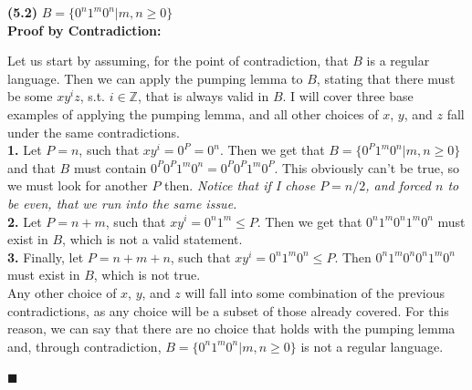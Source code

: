 \documentclass[11pt]{article}
\begin{document}
\textbf{(5.2)} $B=\{0^n 1^m 0^n | m,n \geq 0\}$\\

\textbf{Proof by Contradiction:}

Let us start by assuming, for the point of contradiction, that $B$ is a regular language. Then we can apply the pumping lemma to $B$, stating that there must be some $xy^i z$, s.t. $i\in \mathbb{Z}$, that is always valid in $B$. I will cover three base examples of applying the pumping lemma, and all other choices of $x$, $y$, and $z$ fall under the same contradictions. \\

\textbf{1.} Let $P=n$, such that $xy^i = 0^P = 0^n$. Then we get that $B=\{0^P 1^m 0^n | m,n \geq 0\}$ and that $B$ must contain $0^P 0^P 1^m 0^n = 0^P 0^P 1^m 0^P$. This obviously can't be true, so we must look for another $P$ then. \textit{Notice that if I chose $P=n/2$, and forced $n$ to be even, that we run into the same issue. }\\

\textbf{2.} Let $P=n+m$, such that $xy^i = 0^n 1^m \leq P$. Then we get that $0^n 1^m 0^n 1^m 0^n$ must exist in $B$, which is not a valid statement.\\

\textbf{3.} Finally, let $P=n+m+n$, such that $xy^i = 0^n 1^m 0^n \leq P$. Then $0^n 1^m 0^n 0^n 1^m 0^n$ must exist in $B$, which is not true.\\

Any other choice of $x$, $y$, and $z$ will fall into some combination of the previous contradictions, as any choice will be a subset of those already covered. For this reason, we can say that there are no choice that holds with the pumping lemma and, through contradiction, $B=\{0^n 1^m 0^n | m,n \geq 0\}$ is not a regular language. 
\begin{flushright}$\blacksquare$\end{flushright}
\end{document}
